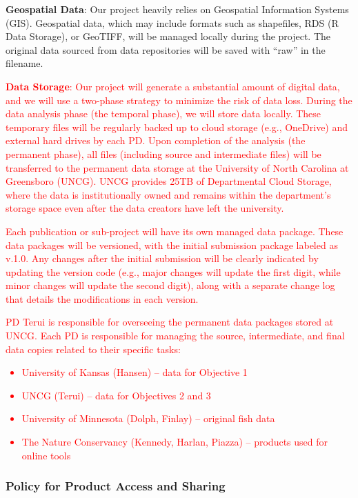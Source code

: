 \documentclass[12pt, class=article, crop=false]{standalone}
\begin{document}
\textbf{Geospatial Data}: Our project heavily relies on Geospatial Information Systems (GIS). Geospatial data, which may include formats such as shapefiles, RDS (R Data Storage), or GeoTIFF, will be managed locally during the project.
The original data sourced from data repositories will be saved with ``raw'' in the filename.

\textcolor{red}{\textbf{Data Storage}:
Our project will generate a substantial amount of digital data, and we will use a two-phase strategy to minimize the risk of data loss.
During the data analysis phase (the temporal phase), we will store data locally.
These temporary files will be regularly backed up to cloud storage (e.g., OneDrive) and external hard drives by each PD.
Upon completion of the analysis (the permanent phase), all files (including source and intermediate files) will be transferred to the permanent data storage at the University of North Carolina at Greensboro (UNCG).
UNCG provides 25TB of Departmental Cloud Storage, where the data is institutionally owned and remains within the department's storage space even after the data creators have left the university.}

\textcolor{red}{Each publication or sub-project will have its own managed data package. These data packages will be versioned, with the initial submission package labeled as v.1.0. Any changes after the initial submission will be clearly indicated by updating the version code (e.g., major changes will update the first digit, while minor changes will update the second digit), along with a separate change log that details the modifications in each version.}

\textcolor{red}{PD Terui is responsible for overseeing the permanent data packages stored at UNCG.
Each PD is responsible for managing the source, intermediate, and final data copies related to their specific tasks:
\begin{itemize}
    \item University of Kansas (Hansen) -- data for Objective 1
    \item UNCG (Terui) -- data for Objectives 2 and 3
    \item University of Minnesota (Dolph, Finlay) -- original fish data
    \item The Nature Conservancy (Kennedy, Harlan, Piazza) -- products used for online tools
\end{itemize}}

\subsubsection*{Policy for Product Access and Sharing}
\end{document}
